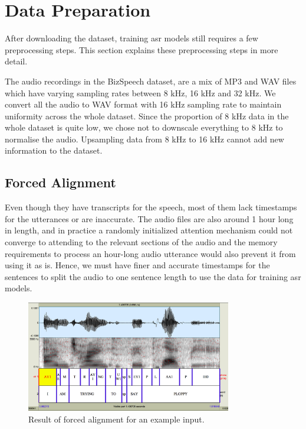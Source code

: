 \section{Data Preparation}
\label{section:dataprep}
After downloading the dataset, training \acrshort{asr} models still requires a few preprocessing steps. This section explains these preprocessing steps in more detail. 

The audio recordings in the BizSpeech dataset, are a mix of MP3 and WAV files which have varying sampling rates between 8 kHz, 16 kHz and 32 kHz. We convert all the audio to WAV format with 16 kHz sampling rate to maintain uniformity across the whole dataset. Since the proportion of 8 kHz data in the whole dataset is quite low, we chose not to downscale everything to 8 kHz to normalise the audio. Upsampling data from 8 kHz to 16 kHz cannot add new information to the dataset. 

\subsection{Forced Alignment}
Even though they have transcripts for the speech, most of them lack timestamps for the utterances or are inaccurate. The audio files are also around 1 hour long in length, and in practice a randomly initialized attention mechanism could not converge to attending to the relevant sections of the audio and the memory requirements to process an hour-long audio utterance would also prevent it from using it as is. Hence, we must have finer and accurate timestamps for the sentences to split the audio to one sentence length to use the data for training \acrshort{asr} models.  

\begin{figure}[ht]
  \begin{center}
    \includegraphics[width=0.8\textwidth]{images/ploppy.png} 
    \caption{Result of forced alignment for an example input. \cite{Yuan2008SPEAKERCORPUS}}
    \label{fig:p2fa}
  \end{center}
\end{figure}

